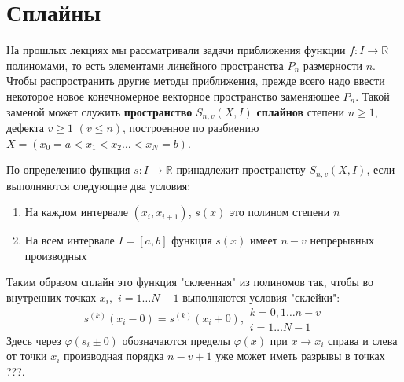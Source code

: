 \section{Сплайны}



На прошлых лекциях мы рассматривали задачи приближения функции $f:I \rightarrow\mathbb{R}$ полиномами, то есть элементами линейного пространства $P_n$ размерности $n$. Чтобы распространить другие методы приближения, прежде всего надо ввести некоторое новое конечномерное векторное пространство заменяющее $P_n$. Такой заменой может служить \textbf{ пространство} $S_{n,v}(X,I)$ \textbf{сплайнов} степени $n\geq 1$, дефекта $v\geq 1$ $(v\leq n)$, построенное по разбиению $X = (x_0=a < x_1 < x_2\ldots < x_N=b)$. 

По определению функция $s:I\rightarrow \mathbb{R}$ принадлежит пространству $S_{n,v}(X,I)$, если выполняются следующие два условия:
\begin{enumerate}
	\item На каждом интервале $(x_i,x_{i+1})$, $s(x)$ это полином степени $n$
	\item На всем интервале $I=[a,b]$ функция $s(x)$ имеет $n-v$ непрерывных производных
\end{enumerate}
Таким образом сплайн это функция "склеенная" из полиномов так, чтобы во внутренних точках $x_i,$ $ i = 1\ldots N-1$ выполняются условия "склейки":
\begin{equation}
s^{\left( k\right) }\left( x_{i}-0\right) =s^{\left( k\right) }\left( x_{i}+0\right),
\begin{aligned}k=0,1\ldots n-v\\ i=1\ldots N-1\end{aligned}
\end{equation}
Здесь через $\varphi(s_i\pm 0)$ обозначаются пределы $\varphi(x)$ при $x \rightarrow x_i$ справа и слева от точки $x_i$ производная порядка $n-v+1$ уже может иметь разрывы в точках ???.

